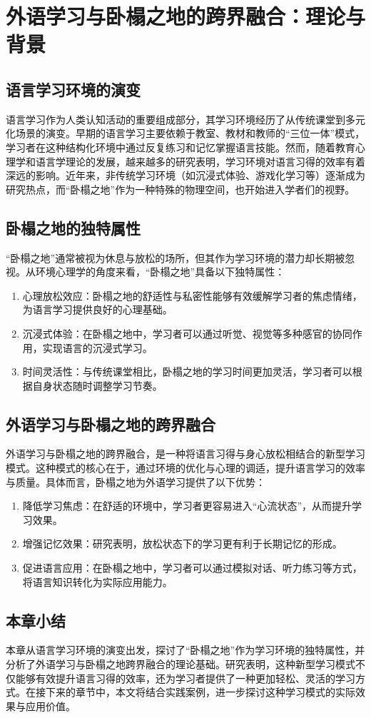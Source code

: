 
\section{外语学习与卧榻之地的跨界融合：理论与背景}

\subsection{语言学习环境的演变}

语言学习作为人类认知活动的重要组成部分，其学习环境经历了从传统课堂到多元化场景的演变。早期的语言学习主要依赖于教室、教材和教师的“三位一体”模式，学习者在这种结构化环境中通过反复练习和记忆掌握语言技能。然而，随着教育心理学和语言学理论的发展，越来越多的研究表明，学习环境对语言习得的效率有着深远的影响\cite{krashen1982principles}。近年来，非传统学习环境（如沉浸式体验、游戏化学习等）逐渐成为研究热点，而“卧榻之地”作为一种特殊的物理空间，也开始进入学者们的视野。


\subsection{卧榻之地的独特属性}
“卧榻之地”通常被视为休息与放松的场所，但其作为学习环境的潜力却长期被忽视。从环境心理学的角度来看，“卧榻之地”具备以下独特属性：

\begin{enumerate}
    \item 心理放松效应：卧榻之地的舒适性与私密性能够有效缓解学习者的焦虑情绪，为语言学习提供良好的心理基础\cite{fredrickson2001role}。
    \item 沉浸式体验：在卧榻之地中，学习者可以通过听觉、视觉等多种感官的协同作用，实现语言的沉浸式学习。
    \item 时间灵活性：与传统课堂相比，卧榻之地的学习时间更加灵活，学习者可以根据自身状态随时调整学习节奏。
\end{enumerate}

\subsection{外语学习与卧榻之地的跨界融合}

外语学习与卧榻之地的跨界融合，是一种将语言习得与身心放松相结合的新型学习模式。这种模式的核心在于，通过环境的优化与心理的调适，提升语言学习的效率与质量。具体而言，卧榻之地为外语学习提供了以下优势：

\begin{enumerate}
    \item 降低学习焦虑：在舒适的环境中，学习者更容易进入“心流状态”\cite{csikszentmihalyi1990flow}，从而提升学习效果。
    \item 增强记忆效果：研究表明，放松状态下的学习更有利于长期记忆的形成\cite{mcgaugh2003memory}。
    \item 促进语言应用：在卧榻之地中，学习者可以通过模拟对话、听力练习等方式，将语言知识转化为实际应用能力。
\end{enumerate}


\subsection{本章小结}
本章从语言学习环境的演变出发，探讨了“卧榻之地”作为学习环境的独特属性，并分析了外语学习与卧榻之地跨界融合的理论基础。研究表明，这种新型学习模式不仅能够有效提升语言习得的效率，还为学习者提供了一种更加轻松、灵活的学习方式。在接下来的章节中，本文将结合实践案例，进一步探讨这种学习模式的实际效果与应用价值。